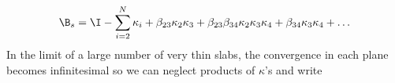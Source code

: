 \begin{equation}
  \B_s = \I - \sum\limits^{N}_{i=2} \kappa_i + \beta_{23} \kappa_2 \kappa_3 + \beta_{23}\beta_{34} \kappa_2 \kappa_3 \kappa_4  +\beta_{34} \kappa_3\kappa_4 +\ldots 
\end{equation}
In the limit of a large number of very thin slabs, the convergence in each plane becomes infinitesimal so we can neglect products of $\kappa$'s and write
  